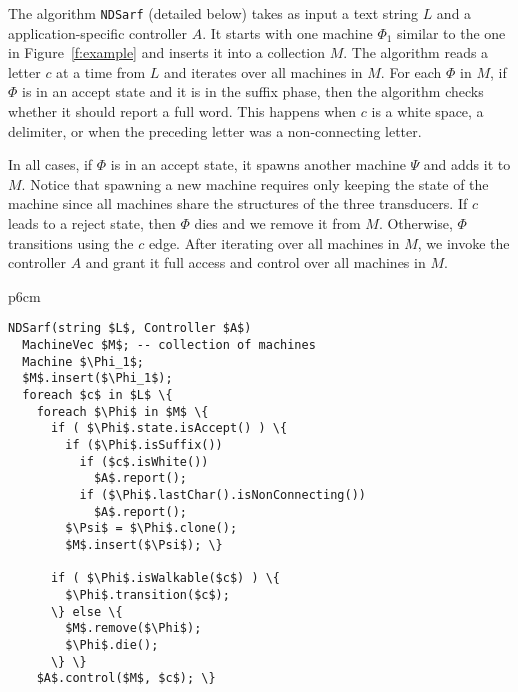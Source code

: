 \documentclass[11pt]{article}
\newcommand{\CodeIn}[1]{{\small\texttt{#1}}}
\begin{document}
The algorithm \CodeIn{NDSarf} (detailed below)
takes as input a text string $L$ and a application-specific controller
$A$. 
It starts with one machine $\Phi_1$ similar to the one in 
Figure~\ref{f:example} and inserts it into a collection
$M$. 
The algorithm reads a letter $c$ at a time from $L$
and iterates over all machines in $M$. 
For each $\Phi$ in $M$,
if $\Phi$ is in an accept state and it is in the suffix
phase, then the algorithm checks whether it should report
a full word. 
This happens when $c$ is a white space, a delimiter, 
or when the preceding letter %
was a non-connecting letter. 

In all cases, if $\Phi$ is in an accept state, 
it spawns another machine $\Psi$ and adds it to $M$. 
Notice that spawning a new machine requires only keeping
the state of the machine since all machines share the
structures of the three transducers.
If $c$ leads to a reject state, then $\Phi$ dies 
and we remove it from $M$. 
Otherwise, $\Phi$ transitions using the $c$ edge.
After iterating over all machines in $M$, we invoke the 
controller $A$
and grant it full access and control over
all machines in $M$. 


\begin{table}[tb]
\begin{tabular} {p{6cm}}
\begin{Verbatim}[fontsize=\relsize{-2},
frame=topline,framesep=4mm,label=\fbox{NDSarf algorithm},
commandchars=\\\{\}, codes={\catcode`$=3\catcode`_=8}]
NDSarf(string $L$, Controller $A$) 
  MachineVec $M$; -- collection of machines
  Machine $\Phi_1$;
  $M$.insert($\Phi_1$);
  foreach $c$ in $L$ \{
    foreach $\Phi$ in $M$ \{
      if ( $\Phi$.state.isAccept() ) \{
        if ($\Phi$.isSuffix())
          if ($c$.isWhite())  
            $A$.report();
          if ($\Phi$.lastChar().isNonConnecting())
            $A$.report();
        $\Psi$ = $\Phi$.clone();
        $M$.insert($\Psi$); \}

      if ( $\Phi$.isWalkable($c$) ) \{
        $\Phi$.transition($c$);
      \} else \{
        $M$.remove($\Phi$);
        $\Phi$.die();
      \} \} 
    $A$.control($M$, $c$); \}
\end{Verbatim}
\end{tabular}
\label{a:ndsarf}
\end{table}
\end{document}
